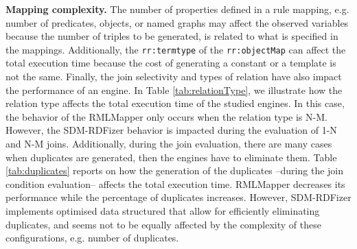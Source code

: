 \noindent \textbf{Mapping complexity.} The number of properties defined in a rule mapping, e.g. number of predicates, objects, or named graphs may affect the observed variables because the number of triples to be generated, is related to what is specified in the mappings. Additionally, the \texttt{rr:termtype} of the \texttt{rr:objectMap} can affect the total execution time because the cost of generating a constant or a template is not the same. Finally, the join selectivity and types of relation have also impact the performance of an engine. In Table \ref{tab:relationType}, we illustrate how the relation type affects the total execution time of the studied engines. In this case, the behavior of the RMLMapper only occurs when the relation type is N-M. However, the SDM-RDFizer behavior is impacted during the evaluation of 1-N and N-M joins. Additionally, during the join evaluation, there are many cases when duplicates are generated, then the engines have to eliminate them. Table \ref{tab:duplicates} reports on how the generation of the duplicates --during the join condition evaluation-- affects the total execution time. RMLMapper decreases its performance while the percentage of duplicates increases. However,  SDM-RDFizer implements optimised data structured that allow for efficiently eliminating duplicates, and seems not to be equally affected by the complexity of these configurations, e.g. number of duplicates. 

